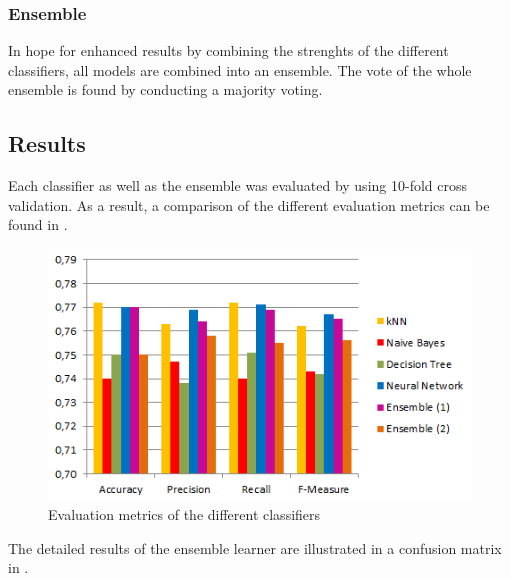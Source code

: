 \subsubsection*{Ensemble}
In hope for enhanced results by combining the strenghts of the
different classifiers, all models are combined into an ensemble. The
vote of the whole ensemble is found by conducting a majority voting.

\subsection{Results}
Each classifier as well as the ensemble was evaluated by using 10-fold
cross validation.
As a result, a comparison of the different evaluation metrics can
be found in .

\begin{figure}[h]
	\centering
	\includegraphics[width=\columnwidth]{../../charts/results.png}
	\caption{Evaluation metrics of the different classifiers}
	\label{fig:result}
\end{figure}

\noindent The detailed results of the ensemble learner are illustrated in a
confusion matrix in .

\begin{table}[h]
	\centering
	\caption{Confusion matrix of the ensemble}
	\label{tab:mat-vote}
\end{table}


